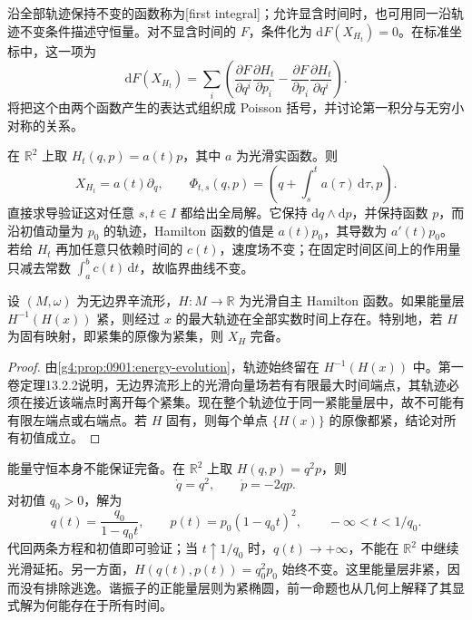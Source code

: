 沿全部轨迹保持不变的函数称为[first integral]；允许显含时间时，也可用同一沿轨迹不变条件描述守恒量。对不显含时间的 \(F\)，条件化为 \(\mathrm{d}F(X_{H_t})=0\)。在标准坐标中，这一项为
\[
	\mathrm{d}F(X_{H_t})=
	\sum_i\left(
	\frac{\partial F}{\partial q^i}\frac{\partial H_t}{\partial p_i}
	-\frac{\partial F}{\partial p_i}\frac{\partial H_t}{\partial q^i}
	\right).
\]
将把这个由两个函数产生的表达式组织成 Poisson 括号，并讨论第一积分与无穷小对称的关系。

\begin{example}\label{g4:exm:0901:time-dependent-translation}
	在 \(\mathbb R^2\) 上取 \(H_t(q,p)=a(t)p\)，其中 \(a\) 为光滑实函数。则
	\[
		X_{H_t}=a(t)\partial_q,
		\qquad
		\Phi_{t,s}(q,p)=\left(q+\int_s^t a(\tau)\,\mathrm{d}\tau,p\right).
	\]
	直接求导验证这对任意 \(s,t\in I\) 都给出全局解。它保持 \(\mathrm{d}q\wedge\mathrm{d}p\)，并保持函数 \(p\)，而沿初值动量为 \(p_0\) 的轨迹，Hamilton 函数的值是 \(a(t)p_0\)，其导数为 \(a'(t)p_0\)。若给 \(H_t\) 再加任意只依赖时间的 \(c(t)\)，速度场不变；在固定时间区间上的作用量只减去常数 \(\int_a^b c(t)\,\mathrm{d}t\)，故临界曲线不变。
\end{example}

\begin{proposition}\label{g4:prop:0901:compact-energy-complete}
	设 \((M,\omega)\) 为无边界辛流形，\(H:M\to\mathbb R\) 为光滑自主 Hamilton 函数。如果能量层 \(H^{-1}(H(x))\) 紧，则经过 \(x\) 的最大轨迹在全部实数时间上存在。特别地，若 \(H\) 为固有映射，即紧集的原像为紧集，则 \(X_H\) 完备。
\end{proposition}
\begin{proof}
	由\cref{g4:prop:0901:energy-evolution}，轨迹始终留在 \(H^{-1}(H(x))\) 中。第一卷定理13.2.2说明，无边界流形上的光滑向量场若有有限最大时间端点，其轨迹必须在接近该端点时离开每个紧集。现在整个轨迹位于同一紧能量层中，故不可能有有限左端点或右端点。若 \(H\) 固有，则每个单点 \(\{H(x)\}\) 的原像都紧，结论对所有初值成立。
\end{proof}

\begin{example}\label{g4:exm:0901:energy-with-escape}
	能量守恒本身不能保证完备。在 \(\mathbb R^2\) 上取 \(H(q,p)=q^2p\)，则
	\[
		\dot q=q^2,\qquad \dot p=-2qp.
	\]
	对初值 \(q_0>0\)，解为
	\[
		q(t)=\frac{q_0}{1-q_0t},\qquad
		p(t)=p_0(1-q_0t)^2,
		\qquad -\infty<t<1/q_0.
	\]
	代回两条方程和初值即可验证；当 \(t\uparrow1/q_0\) 时，\(q(t)\to+\infty\)，不能在 \(\mathbb R^2\) 中继续光滑延拓。另一方面，\(H(q(t),p(t))=q_0^2p_0\) 始终不变。这里能量层非紧，因而没有排除逃逸。谐振子的正能量层则为紧椭圆，前一命题也从几何上解释了其显式解为何能存在于所有时间。
\end{example}

